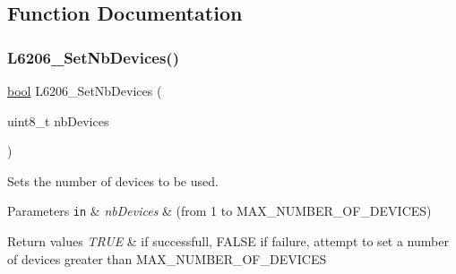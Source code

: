 \subsection{Function Documentation}
\mbox{\label{group___l6206_gaa25442be9b6a3d12b3c3b28568350528}} 
\subsubsection{\texorpdfstring{L6206\+\_\+\+Set\+Nb\+Devices()}{L6206\_SetNbDevices()}}
{\footnotesize\ttfamily \mbox{\hyperlink{group___motor___boolean___type_ga0ecf26b576b9a54eca656b9be7ba6a06}{bool}} L6206\+\_\+\+Set\+Nb\+Devices (\begin{DoxyParamCaption}\item[{uint8\+\_\+t}]{nb\+Devices }\end{DoxyParamCaption})}



Sets the number of devices to be used. 


\begin{DoxyParams}[1]{Parameters}
\mbox{\tt in}  & {\em nb\+Devices} & (from 1 to M\+A\+X\+\_\+\+N\+U\+M\+B\+E\+R\+\_\+\+O\+F\+\_\+\+D\+E\+V\+I\+C\+ES) \\
\hline
\end{DoxyParams}

\begin{DoxyRetVals}{Return values}
{\em T\+R\+UE} & if successfull, F\+A\+L\+SE if failure, attempt to set a number of devices greater than M\+A\+X\+\_\+\+N\+U\+M\+B\+E\+R\+\_\+\+O\+F\+\_\+\+D\+E\+V\+I\+C\+ES \\
\hline
\end{DoxyRetVals}
